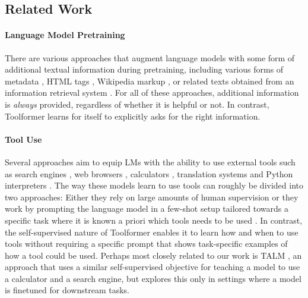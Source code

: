 \documentclass[11pt]{article}
\newcommand{\ours}[0]{Toolformer}
\begin{document}
\begin{CJK*}{UTF8}{gbsn}
\section{Related Work}

\paragraph{Language Model Pretraining} There are various approaches that augment language models with some form of additional textual information during pretraining, including various forms of metadata \citep{keskar2019ctrl}, HTML tags \citep{aghajanyan2021htlm}, Wikipedia markup \citep{schick2022peer}, or related texts obtained from an information retrieval system \citep{guu2020realm,borgeaud2021retro,izacard2022atlas}. For all of these approaches, additional information is \emph{always} provided, regardless of whether it is helpful or not. In contrast, \ours{} learns for itself to explicitly asks for the right information.

\paragraph{Tool Use} Several approaches aim to equip LMs with the ability to use external tools such as search engines \citep{komeili-etal-2022-internet, thoppilan2022lamda, lazaridou2022internet,shuster2022blenderbot,yao2022react}, web browsers \citep{nakano2021webgpt}, calculators \citep{cobbe2021training,thoppilan2022lamda}, translation systems \citep{thoppilan2022lamda} and Python interpreters \citep{gao2022pal}. The way these models learn to use tools can roughly be divided into two approaches: Either they rely on large amounts of human supervision \citep{komeili-etal-2022-internet,nakano2021webgpt,thoppilan2022lamda} or they work by prompting the language model in a few-shot setup tailored towards a specific task where it is known a priori which tools needs to be used \citep{gao2022pal,lazaridou2022internet, yao2022react}. In contrast, the self-supervised nature of \ours{} enables it to learn how and when to use tools without requiring a specific prompt that shows task-specific examples of how a tool could be used. Perhaps most closely related to our work is TALM \citep{parisi2022talm}, an approach that uses a similar self-supervised objective for teaching a model to use a calculator and a search engine, but explores this only in settings where a model is finetuned for downstream tasks.


\end{CJK*}
\end{document}
